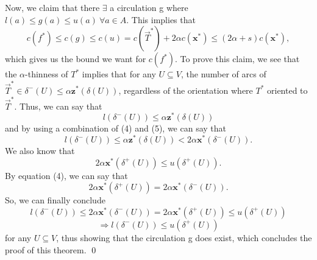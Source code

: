 \documentclass[oneside]{projectpaper} %
\begin{document}
Now, we claim that there $\exists$ a circulation g where $l(a) \leq g(a) \leq u(a) \ \forall a \in A$. This implies that
\begin{equation*}
c(f^*) \leq c(g) \leq c(u) = c(\overrightarrow{T}^*) + 2\alpha c(\textbf{x}^*) \leq (2\alpha + s)c(\textbf{x}^*),
\end{equation*}
which gives us the bound we want for $c(f^*)$. To prove this claim, we see that the $\alpha$-thinness of $T^*$ implies that for any $U \subseteq V$, the number of arcs of $\overrightarrow{T}^*  \in \delta^-(U) \leq \alpha \textbf{z}^*(\delta(U))$, regardless of the orientation where $T^*$ oriented to $\overrightarrow{T}^* $. Thus, we can say that
\begin{equation*}
  l(\delta^-(U)) \leq \alpha \textbf{z}^*(\delta(U))
\end{equation*}
and by using a combination of (4) and (5), we can say that
\begin{equation*}
  l(\delta^-(U)) \leq \alpha \textbf{z}^*(\delta(U)) < 2\alpha \textbf{x}^*(\delta^-(U)).
\end{equation*}
We also know that 
\begin{equation*}
 2\alpha \textbf{x}^*(\delta^+(U)) \leq u(\delta^+(U)). 
\end{equation*}
By equation (4), we can say that 
\begin{equation*}
2\alpha \textbf{x}^*(\delta^+(U)) = 2\alpha \textbf{x}^*(\delta^-(U)).
\end{equation*}
So, we can finally conclude 
\begin{equation*}
  l(\delta^-(U)) \leq 2\alpha \textbf{x}^*(\delta^-(U)) = 2\alpha \textbf{x}^*(\delta^+(U)) \leq u(\delta^+(U))
\end{equation*}
\begin{equation*}
\Rightarrow l(\delta^-(U)) \leq u(\delta^+(U))
\end{equation*}
for any $U \subseteq V$, thus showing that the circulation g does exist, which concludes the proof of this theorem. \hfill\qed

\end{document}
